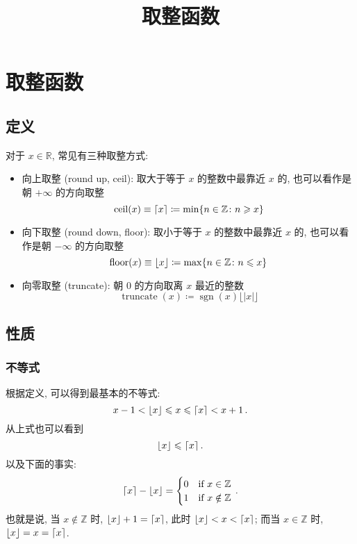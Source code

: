 \documentclass[UTF8]{ctexart}
\title{取整函数}
\newcommand{\R}{\mathbb R}
\newcommand{\Z}{\mathbb Z}
\DeclarePairedDelimiter\set{\{}{\}}
\DeclarePairedDelimiter\Floor{\lfloor}{\rfloor}
\DeclarePairedDelimiter\Ceil{\lceil}{\rceil}
\DeclareMathOperator{\truncate}{truncate}
\DeclareMathOperator{\floor}{floor}
\DeclareMathOperator{\ceil}{ceil}
\DeclareMathOperator{\sgn}{sgn}
\begin{document}
\maketitle
\tableofcontents

\section{取整函数}
\subsection{定义}
对于 $ x \in \R $, 常见有三种取整方式:
\begin{itemize}
    \item 向上取整 (round up, ceil): 取大于等于 $ x $ 的整数中最靠近 $ x $ 的, 也可以看作是朝 $ +\infty $ 的方向取整
    \[ \ceil(x) \equiv \lceil x \rceil \coloneqq \min \set{n \in \Z \colon n \geqslant x} \]
    \item 向下取整 (round down, floor): 取小于等于 $ x $ 的整数中最靠近 $ x $ 的, 也可以看作是朝 $ -\infty $ 的方向取整
    \[ \floor(x) \equiv \lfloor x \rfloor \coloneqq \max\set{n \in \Z \colon n \leqslant x} \]
    \item 向零取整 (truncate): 朝 $ 0 $ 的方向取离 $ x $ 最近的整数
    \[ \truncate(x) \coloneqq \sgn (x) \lfloor |x| \rfloor \]
\end{itemize}

\subsection{性质}
\subsubsection{不等式}
根据定义, 可以得到最基本的不等式:
\[ 
    x - 1 < \Floor{x} \leqslant x \leqslant \Ceil{x} < x + 1 \,.
\]
从上式也可以看到
\[ 
    \Floor{x} \leqslant \Ceil{x} \,.
\]
以及下面的事实:
\[ 
    \Ceil{x} - \Floor{x} = \begin{cases}
        0 & \text{if } x \in \Z \\
        1 & \text{if } x \notin \Z
    \end{cases}  \,.
\]
也就是说, 当 $ x \notin \Z $ 时, $ \Floor{x} + 1 = \Ceil{x} $, 此时 $ \Floor{x} < x < \Ceil{x} $; 而当 $ x \in \Z $ 时, $ \Floor{x} = x = \Ceil{x} $.
\end{document}
